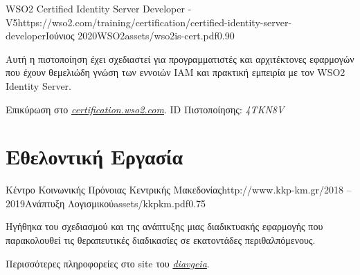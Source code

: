 \documentclass{mycv}
\begin{document}
	\vspace{0.5cm}

	\begin{EntryDatedLogo}{WSO2 Certified Identity Server
			Developer - V5}{https://wso2.com/training/certification/certified-identity-server-developer}{Ιούνιος 2020}{WSO2}{assets/wso2is-cert.pdf}{0.90}
		\begin{Itemize}
			\item Αυτή η πιστοποίηση έχει σχεδιαστεί για προγραμματιστές και αρχιτέκτονες εφαρμογών που έχουν θεμελιώδη γνώση των εννοιών IAM και πρακτική εμπειρία με τον WSO2 Ιdentity Server.
		\end{Itemize}
		\vspace{-0.3cm}
		Επικύρωση στο \href{https://certification.wso2.com}{\textit{certification.wso2.com}}. ID Πιστοποίησης: \textit{4TKN8V}
	\end{EntryDatedLogo}

	\section{Εθελοντική Εργασία}
	\begin{EntryDatedLogo}{Κέντρο Κοινωνικής Πρόνοιας Κεντρικής Μακεδονίας}{http://www.kkp-km.gr/}{2018 -- 2019}{Ανάπτυξη Λογισμικού}{assets/kkpkm.pdf}{0.75}
		\begin{Itemize}
			\item Ηγήθηκα του σχεδιασμού και της ανάπτυξης μιας διαδικτυακής εφαρμογής που παρακολουθεί τις θεραπευτικές διαδικασίες σε εκατοντάδες περιθαλπόμενους.
		\end{Itemize}
		\vspace{-0.3cm}
		Περισσότερες πληροφορείες στο site του  \href{https://diavgeia.gov.gr/decision/view/\%CE\%A8\%CE\%A6\%CE\%A1\%CE\%93\%CE\%9F\%CE\%9E\%CE\%A7\%CE\%A3-\%CE\%A0\%CE\%93\%CE\%A6}{\textit{diavgeia}}.
	\end{EntryDatedLogo}
\end{document}
